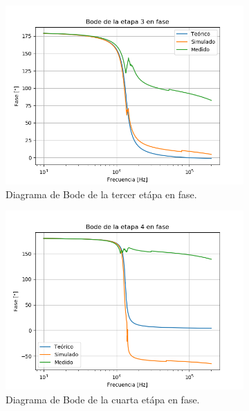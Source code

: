 \begin{figure}[H]
\begin{subfigure}{.49\textwidth}
	\includegraphics[width=\textwidth]{Imagenes/Pha-3.png}
	\caption{Diagrama de Bode de la tercer etápa en fase.}
	\label{fig:pha3}
\end{subfigure}
\centering
\begin{subfigure}{.49\textwidth}
\centering
	\includegraphics[width=\textwidth]{Imagenes/Pha-4.png}
	\caption{Diagrama de Bode de la cuarta etápa en fase.}
	\label{fig:pha4}
\end{subfigure}
\centering
\begin{subfigure}{.49\textwidth}
\centering

\end{subfigure}
\end{figure}
